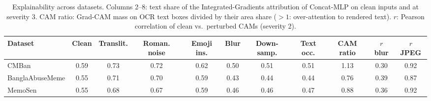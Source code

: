 \begin{table}[t]
\centering
\small
\caption{Explainability across datasets. Columns 2--8: text share of the Integrated-Gradients attribution of Concat-MLP on clean inputs and at severity 3. CAM ratio: Grad-CAM mass on OCR text boxes divided by their area share ($>1$: over-attention to rendered text). $r$: Pearson correlation of clean vs.\ perturbed CAMs (severity 2).}
\label{tab:cross_xai}
\begin{adjustbox}{max width=\textwidth}
\begin{tabular}{lcccccccccc}
\toprule
Dataset & Clean & Translit. & Roman. noise & Emoji ins. & Blur & Down-samp. & Text occ. & CAM ratio & $r$ blur & $r$ JPEG \\
\midrule
CMBan & 0.59 & 0.73 & 0.72 & 0.62 & 0.50 & 0.51 & 0.51 & 1.13 & 0.30 & 0.92 \\
BanglaAbuseMeme & 0.55 & 0.71 & 0.70 & 0.59 & 0.43 & 0.44 & 0.44 & 0.76 & 0.39 & 0.87 \\
MemoSen & 0.55 & 0.68 & 0.67 & 0.59 & 0.46 & 0.46 & 0.47 & 0.88 & 0.36 & 0.92 \\
\bottomrule
\end{tabular}
\end{adjustbox}
\end{table}
